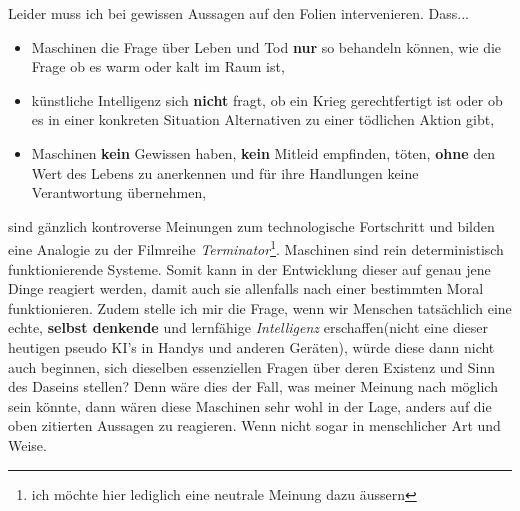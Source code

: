 Leider muss ich bei gewissen Aussagen auf den Folien intervenieren. Dass...
\begin{itemize}
	\item[ ] Maschinen die Frage über Leben und Tod \textbf{nur} so behandeln können, wie die Frage ob es warm oder kalt im Raum ist,\\
	\item[ ] künstliche Intelligenz sich \textbf{nicht} fragt, ob ein Krieg gerechtfertigt ist oder ob es in einer konkreten Situation Alternativen zu einer tödlichen Aktion gibt,\\
	\item[ ] Maschinen \textbf{kein} Gewissen haben, \textbf{kein} Mitleid empfinden, töten, \textbf{ohne} den
Wert des Lebens zu anerkennen und für ihre Handlungen keine Verantwortung übernehmen,\\
\end{itemize}
sind gänzlich kontroverse Meinungen zum technologische Fortschritt und bilden eine Analogie zu der Filmreihe \textit{Terminator}\footnote{ich möchte hier lediglich eine neutrale Meinung dazu äussern}. Maschinen sind rein deterministisch funktionierende Systeme. Somit kann in der Entwicklung dieser auf genau jene Dinge reagiert werden, damit auch sie allenfalls nach einer bestimmten Moral funktionieren. Zudem stelle ich mir die Frage, wenn wir Menschen tatsächlich eine echte, \textbf{selbst denkende} und lernfähige \textit{Intelligenz} \glqq erschaffen\grqq\;(nicht eine dieser heutigen pseudo KI's in Handys und anderen Geräten), würde diese dann nicht auch beginnen, sich dieselben essenziellen Fragen über deren Existenz und Sinn des Daseins stellen? Denn wäre dies der Fall, was meiner Meinung nach möglich sein könnte, dann wären diese Maschinen sehr wohl in der Lage, anders auf die oben zitierten Aussagen zu reagieren. Wenn nicht sogar in menschlicher Art und Weise.\\